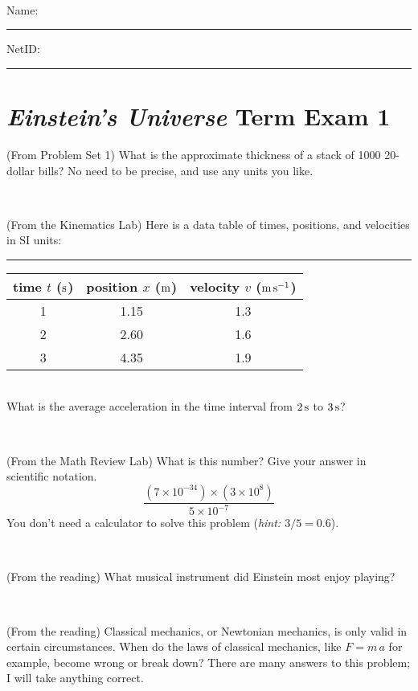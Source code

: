 \documentclass[12pt, letterpaper]{article}
\begin{document}
\vfill ~


\cleardoublepage



\noindent
Name: \rule[-1ex]{0.60\textwidth}{0.1pt}
NetID: \rule[-1ex]{0.20\textwidth}{0.1pt}

\section*{\textsl{Einstein's Universe} Term Exam 1}
\setcounter{problem}{1}


\begin{problem} (From Problem Set 1)
What is the approximate thickness of a stack of 1000 20-dollar bills?
No need to be precise, and use any units you like.
\end{problem}


\vfill ~

\begin{problem} (From the Kinematics Lab)
Here is a data table of times, positions, and velocities in SI units:\\
\rule{1.0in}{0pt}\begin{tabular}{c|c|c}
time $t$ ($\mathrm{s}$) & position $x$ ($\mathrm{m}$) & velocity $v$ ($\mathrm{m}\,\mathrm{s}^{-1}$) \\
\hline
1 & 1.15 & 1.3 \\
2 & 2.60 & 1.6 \\
3 & 4.35 & 1.9 \\
\hline
\end{tabular}\\
What is the average acceleration in the time interval from $2\,\mathrm{s}$ to $3\,\mathrm{s}$?
\end{problem}


\vfill ~

\begin{problem} (From the Math Review Lab)
What is this number? Give your answer in scientific notation.
$$
\frac{(7\times10^{-34})\times(3\times10^8)}{5\times10^{-7}}
$$
You don't need a calculator to solve this problem (\textit{hint: $3/5=0.6$}).
\end{problem}


\vfill ~

\begin{problem} (From the reading)
What musical instrument did Einstein most enjoy playing?
\end{problem}


\vfill ~


\clearpage


\begin{problem} (From the reading)
Classical mechanics, or Newtonian mechanics, is only valid in certain
circumstances. When do the laws of classical mechanics, like $F =
m\,a$ for example, become wrong or break down? There are many answers
to this problem; I will take anything correct.
\end{problem}
\end{document}

